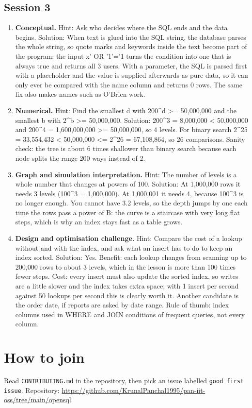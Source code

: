 \documentclass[11pt,a4paper]{article}
\begin{document}
\subsection*{Session 3}
\begin{enumerate}[nosep]
\item \textbf{Conceptual.} Hint: Ask who decides where the SQL ends and the data begins. Solution: When text is glued into the SQL string, the database parses the whole string, so quote marks and keywords inside the text become part of the program: the input x' OR '1'='1 turns the condition into one that is always true and returns all 3 users. With a parameter, the SQL is parsed first with a placeholder and the value is supplied afterwards as pure data, so it can only ever be compared with the name column and returns 0 rows. The same fix also makes names such as O'Brien work.
\item \textbf{Numerical.} Hint: Find the smallest d with 200\textasciicircum{}d \textgreater{}= 50,000,000 and the smallest b with 2\textasciicircum{}b \textgreater{}= 50,000,000. Solution: 200\textasciicircum{}3 = 8,000,000 \textless{} 50,000,000 and 200\textasciicircum{}4 = 1,600,000,000 \textgreater{}= 50,000,000, so 4 levels. For binary search 2\textasciicircum{}25 = 33,554,432 \textless{} 50,000,000 \textless{}= 2\textasciicircum{}26 = 67,108,864, so 26 comparisons. Sanity check: the tree is about 6 times shallower than binary search because each node splits the range 200 ways instead of 2.
\item \textbf{Graph and simulation interpretation.} Hint: The number of levels is a whole number that changes at powers of 100. Solution: At 1,000,000 rows it needs 3 levels (100\textasciicircum{}3 = 1,000,000). At 1,000,001 it needs 4, because 100\textasciicircum{}3 is no longer enough. You cannot have 3.2 levels, so the depth jumps by one each time the rows pass a power of B: the curve is a staircase with very long flat steps, which is why an index stays fast as a table grows.
\item \textbf{Design and optimisation challenge.} Hint: Compare the cost of a lookup without and with the index, and ask what an insert has to do to keep an index sorted. Solution: Yes. Benefit: each lookup changes from scanning up to 200,000 rows to about 3 levels, which in the lesson is more than 100 times fewer steps. Cost: every insert must also update the sorted index, so writes are a little slower and the index takes extra space; with 1 insert per second against 50 lookups per second this is clearly worth it. Another candidate is the order date, if reports are asked by date range. Rule of thumb: index columns used in WHERE and JOIN conditions of frequent queries, not every column.
\end{enumerate}

\section{How to join}
Read \texttt{CONTRIBUTING.md} in the repository, then pick an issue labelled \texttt{good first issue}. Repository: \url{https://github.com/KrunalPanchal1995/pan-iit-oss/tree/main/opensql}
\end{document}
